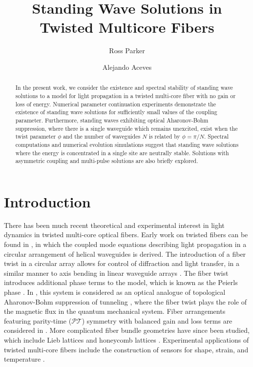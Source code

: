 \documentclass[reprint, amsmath,amssymb,aps,pra]{revtex4-2}
\begin{document}
\title{Standing Wave Solutions in Twisted Multicore Fibers}

\author{Ross Parker}
\address{Department of Mathematics, Southern Methodist Univeristy, 
Dallas, TX 75275}

\author{Alejando Aceves}
\address{Department of Mathematics, Southern Methodist Univeristy, 
Dallas, TX 75275}

\begin{abstract}
In the present work, we consider the existence and spectral stability of standing wave solutions to a model for light propagation in a twisted multi-core fiber with no gain or loss of energy. Numerical parameter continuation experiments demonstrate the existence of standing wave solutions for sufficiently small values of the coupling parameter. Furthermore, standing waves exhibiting optical Aharonov-Bohm suppression, where there is a single waveguide which remains unexcited, exist when the twist parameter $\phi$ and the number of waveguides $N$ is related by $\phi = \pi/N$. Spectral computations and numerical evolution simulations suggest that standing wave solutions where the energy is concentrated in a single site are neutrally stable. Solutions with asymmetric coupling and multi-pulse solutions are also briefly explored. 
\end{abstract}

\maketitle

\section{Introduction}

There has been much recent theoretical and experimental interest in light dynamics in twisted multi-core optical fibers. Early work on twisted fibers can be found in \cite{Longhi2007,Longhi2007b}, in which the coupled mode equations describing light propagation in a circular arrangement of helical waveguides is derived. The introduction of a fiber twist in a circular array allows for control of diffraction and light transfer, in a similar manner to axis bending in linear waveguide arrays \cite{Longhi2005}. The fiber twist introduces additional phase terms to the model, which is known as the Peierls phase \cite{Longhi2007,Peierls1933}. In \cite{Ornigotti2007}, this system is considered as an optical analogue of topological Aharonov-Bohm suppression of tunneling \cite{Loss1992}, where the fiber twist plays the role of the magnetic flux in the quantum mechanical system. Fiber arrangements featuring parity-time ($\mathcal{PT}$) symmetry with balanced gain and loss terms are considered in \cite{Longhi2016,castro2016}. More complicated fiber bundle geometries have since been studied, which include Lieb lattices \cite{Marzuola2019bulk} and honeycomb lattices \cite{Ablowitz2014,Lumer2013}. Experimental applications of twisted multi-core fibers include the construction of sensors for shape, strain, and temperature \cite{Gannot2014,Westbrook2017}. 
\end{document}
